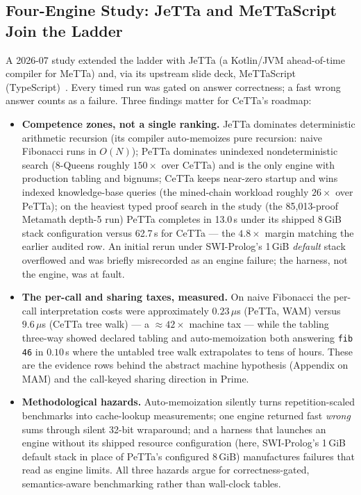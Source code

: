 \documentclass[11pt]{article}
\newcommand{\code}[1]{\texttt{#1}}
\newcommand{\PeTTa}{\textup{PeTTa}}
\newcommand{\CeTTa}{\textup{CeTTa}}
\begin{document}
\subsection{Four-Engine Study: JeTTa and MeTTaScript Join the Ladder}
\label{sec:fourengine}

A 2026-07 study extended the ladder with JeTTa (a Kotlin/JVM
ahead-of-time compiler for MeTTa) and, via its upstream slide deck,
MeTTaScript (TypeScript)~\cite{jetta-slides,jetta-review}.  Every timed
run was gated on answer correctness; a fast wrong answer counts as a
failure.  Three findings matter for \CeTTa{}'s roadmap:

\begin{itemize}
\item \textbf{Competence zones, not a single ranking.}  JeTTa dominates
  deterministic arithmetic recursion (its compiler auto-memoizes pure
  recursion: naive Fibonacci runs in $O(N)$); \PeTTa{} dominates
  unindexed nondeterministic search (8-Queens roughly $150\times$ over
  \CeTTa{}) and is the only engine with production tabling and bignums;
  \CeTTa{} keeps near-zero startup and wins indexed knowledge-base
  queries (the mined-chain workload roughly $26\times$ over \PeTTa{});
  on the heaviest typed proof search in the study (the 85{,}013-proof
  Metamath depth-5 run) \PeTTa{} completes in 13.0\,s under its shipped
  8\,GiB stack configuration versus 62.7\,s for \CeTTa{} --- the
  $4.8\times$ margin matching the earlier audited row.  An initial
  rerun under SWI-Prolog's 1\,GiB \emph{default} stack overflowed and
  was briefly misrecorded as an engine failure; the harness, not the
  engine, was at fault.
\item \textbf{The per-call and sharing taxes, measured.}  On naive
  Fibonacci the per-call interpretation costs were approximately
  $0.23\,\mu$s (\PeTTa{}, WAM) versus $9.6\,\mu$s (\CeTTa{} tree walk)
  --- a $\approx 42\times$ machine tax --- while the tabling three-way
  showed declared tabling and auto-memoization both answering
  \code{fib 46} in $0.10$\,s where the untabled tree walk extrapolates
  to tens of hours.  These are the evidence rows behind the abstract
  machine hypothesis (Appendix on MAM) and the call-keyed sharing
  direction in Prime.
\item \textbf{Methodological hazards.}  Auto-memoization silently turns
  repetition-scaled benchmarks into cache-lookup measurements; one
  engine returned fast \emph{wrong} sums through silent 32-bit
  wraparound; and a harness that launches an engine without its shipped
  resource configuration (here, SWI-Prolog's 1\,GiB default stack in
  place of \PeTTa{}'s configured 8\,GiB) manufactures failures that
  read as engine limits.  All three hazards argue for correctness-gated,
  semantics-aware benchmarking rather than wall-clock tables.
\end{itemize}
\end{document}
